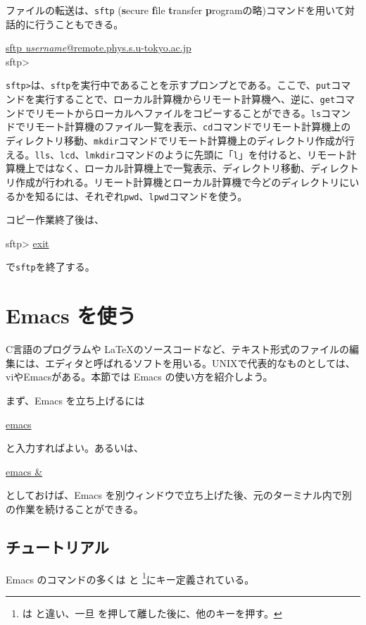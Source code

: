ファイルの転送は、{\tt sftp} ({\bf s}ecure {\bf f}ile {\bf t}ransfer {\bf p}rogramの略)コマンドを用いて対話的に行うこともできる。
\begin{commandline2}
\prompt \underline{sftp {\it username}@remote.phys.s.u-tokyo.ac.jp} \\
sftp>
\end{commandline2} \noindent
\verb|sftp>|は、{\tt sftp}を実行中であることを示すプロンプとである。ここで、{\tt put}コマンドを実行することで、ローカル計算機からリモート計算機へ、逆に、{\tt get}コマンドでリモートからローカルへファイルをコピーすることができる。{\tt ls}コマンドでリモート計算機のファイル一覧を表示、{\tt cd}コマンドでリモート計算機上のディレクトリ移動、{\tt mkdir}コマンドでリモート計算機上のディレクトリ作成が行える。{\tt lls}、{\tt lcd}、{\tt lmkdir}コマンドのように先頭に「{\tt l}」を付けると、リモート計算機上ではなく、ローカル計算機上で一覧表示、ディレクトリ移動、ディレクトリ作成が行われる。リモート計算機とローカル計算機で今どのディレクトリにいるかを知るには、それぞれ{\tt pwd}、{\tt lpwd}コマンドを使う。

コピー作業終了後は、
\begin{commandline2}
sftp> \underline{exit}
\end{commandline2} \noindent
で{\tt sftp}を終了する。

\section{Emacs を使う}

C言語のプログラムや \LaTeX のソースコードなど、テキスト形式のファイルの編集には、エディタと呼ばれるソフトを用いる。UNIXで代表的なものとしては、viやEmacsがある。本節では Emacs の使い方を紹介しよう。

まず、Emacs を立ち上げるには
\begin{commandline2}
\prompt \underline{emacs}
\end{commandline2} \noindent
と入力すればよい。あるいは、
\begin{commandline2}
\prompt \underline{emacs \&}
\end{commandline2} \noindent
としておけば、Emacs を別ウィンドウで立ち上げた後、元のターミナル内で別の作業を続けることができる。
\subsection{チュートリアル}
Emacs のコマンドの多くは
 と \footnote{ は  と違い、一旦  を押して離した後に、他のキーを押す。}にキー定義されている。

